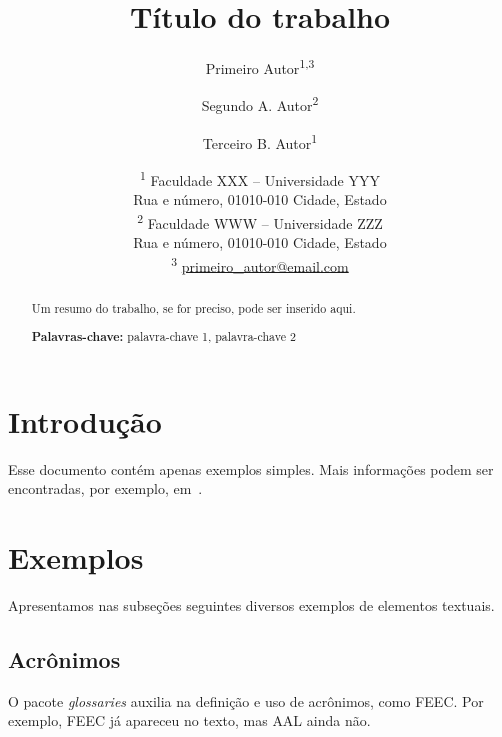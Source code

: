 \documentclass[brazilian, a4paper, 11pt]{article}
\begin{document}
\title{Título do trabalho}

\author{Primeiro Autor\textsuperscript{1,3}
\and Segundo A. Autor\textsuperscript{2}
\and Terceiro B. Autor\textsuperscript{1}}

\date{%
\textsuperscript{1} Faculdade XXX -- Universidade YYY\\
Rua e número, 01010-010 Cidade, Estado\\[1.6ex]
\textsuperscript{2} Faculdade WWW -- Universidade ZZZ\\
Rua e número, 01010-010 Cidade, Estado\\[1.6ex]
\textsuperscript{3} \href{mailto:primeiro_autor@email.com}{primeiro\_autor@email.com}}

\maketitle


\begin{abstract}

Um resumo do trabalho, se for preciso, pode ser inserido aqui.

{\bf\footnotesize Palavras-chave:} palavra-chave 1, palavra-chave 2

\end{abstract}


\tableofcontents


\section{Introdução}
\label{sec:intro}

Esse documento contém apenas exemplos simples.
Mais informações podem ser encontradas, por exemplo, em~\cite{oetiker_not_2015,latex_wikibook}.


\section{Exemplos}

Apresentamos nas subseções seguintes diversos exemplos de elementos textuais.


\subsection{Acrônimos}

O pacote \emph{glossaries} auxilia na definição e uso de acrônimos, como \gls{FEEC}.
Por exemplo, \gls{FEEC} já apareceu no texto, mas \gls{AAL} ainda não.
\end{document}
